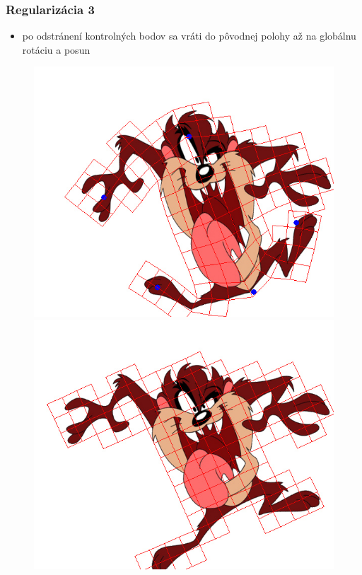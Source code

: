 \documentclass[a4paper]{beamer}
\begin{document}
\begin{frame}	
	\frametitle{Regularizácia 3}
	\begin{itemize}
		\item po odstránení kontrolných bodov sa vráti do pôvodnej polohy až na globálnu rotáciu a posun
	\end{itemize}

	\begin{figure}
		\centering
		\includegraphics[height=0.5\textheight,keepaspectratio]{pic/taz_moved.jpg}
		\includegraphics[height=0.5\textheight,keepaspectratio]{pic/taz_back.jpg}
	\end{figure}
\end{frame}
\end{document}
